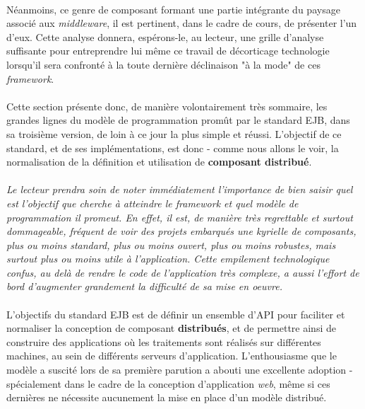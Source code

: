 {   \paragraph{} Néanmoins, ce genre de composant formant une partie intégrante du paysage associé
   aux \textit{middleware}, il est pertinent, dans le cadre de cours, de présenter l'un d'eux. Cette
   analyse donnera, espérons-le, au lecteur, une grille d'analyse suffisante pour entreprendre lui
   même ce travail de décorticage technologie lorsqu'il sera confronté à la toute dernière
   déclinaison "à la mode" de ces \textit{framework}.

   \paragraph{} Cette section présente donc, de manière volontairement très sommaire, les grandes
   lignes du modèle de programmation promût par le standard EJB, dans sa troisième version, de loin
   à ce jour la plus simple et réussi. L'objectif de ce standard, et de ses implémentations, est
   donc - comme nous allons le voir, la normalisation de la définition et utilisation de
   \textbf{composant distribué}.

   \paragraph{} \textit{Le lecteur prendra soin de noter immédiatement l'importance de bien saisir
   quel est l'objectif que cherche à atteindre le framework et quel modèle de programmation
   il promeut. En effet, il est, de manière très regrettable et surtout dommageable, fréquent de
   voir des projets embarqués une kyrielle de composants, plus ou moins standard, plus ou moins
   ouvert, plus ou moins robustes, mais surtout plus ou moins utile à l'application. Cette
   empilement technologique confus, au delà de rendre le code de l'application très complexe, a
   aussi l'effort de bord d'augmenter grandement la difficulté de sa mise en oeuvre.}


   \paragraph{} L'objectifs du standard EJB est de définir un ensemble d'API pour faciliter et
   normaliser la conception de composant \textbf{distribués}, et de permettre ainsi de construire
   des applications où les traitements sont réalisés sur différentes machines, au sein de différents
   serveurs d'application. L'enthousiasme que le modèle a suscité lors de sa première parution a
   abouti une excellente adoption - spécialement dans le cadre de la conception d'application
   \textit{web}, même si ces dernières ne nécessite aucunement la mise en place d'un modèle
   distribué.

}
